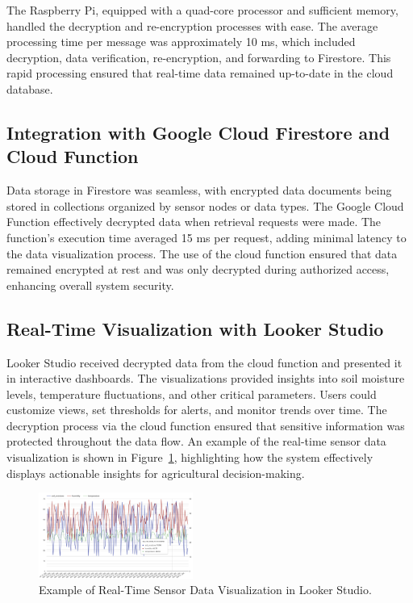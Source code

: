 \documentclass[conference]{IEEEtran}
\begin{document}
The Raspberry Pi, equipped with a quad-core processor and sufficient memory, handled the decryption and re-encryption processes with ease. The average processing time per message was approximately 10 ms, which included decryption, data verification, re-encryption, and forwarding to Firestore. This rapid processing ensured that real-time data remained up-to-date in the cloud database.

\subsection{Integration with Google Cloud Firestore and Cloud Function}

Data storage in Firestore was seamless, with encrypted data documents being stored in collections organized by sensor nodes or data types. The Google Cloud Function effectively decrypted data when retrieval requests were made. The function's execution time averaged 15 ms per request, adding minimal latency to the data visualization process. The use of the cloud function ensured that data remained encrypted at rest and was only decrypted during authorized access, enhancing overall system security.

\subsection{Real-Time Visualization with Looker Studio}

Looker Studio received decrypted data from the cloud function and presented it in interactive dashboards. The visualizations provided insights into soil moisture levels, temperature fluctuations, and other critical parameters. Users could customize views, set thresholds for alerts, and monitor trends over time. The decryption process via the cloud function ensured that sensitive information was protected throughout the data flow.
An example of the real-time sensor data visualization is shown in Figure~\ref{fig:results_visualization}, highlighting how the system effectively displays actionable insights for agricultural decision-making.

\begin{figure}[ht]
\centering
\includegraphics[width=0.45\textwidth]{results image.png} 
\caption{Example of Real-Time Sensor Data Visualization in Looker Studio.}
\label{fig:results_visualization}
\end{figure}
\end{document}
